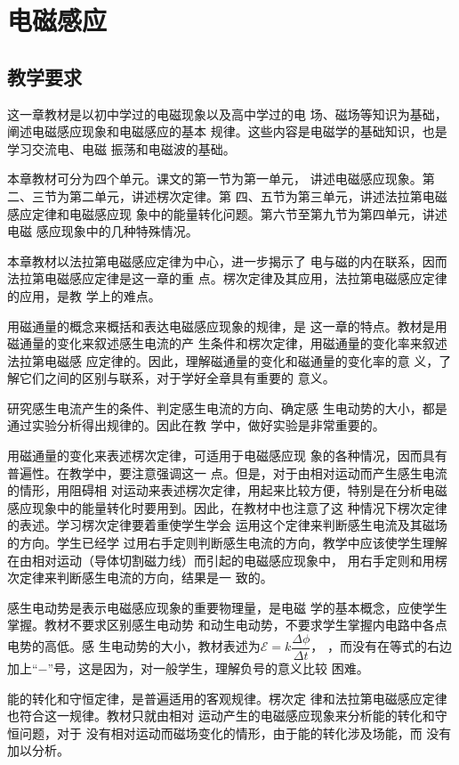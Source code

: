 \chapter{电磁感应}
\section{教学要求}
这一章教材是以初中学过的电磁现象以及高中学过的电
场、磁场等知识为基础，阐述电磁感应现象和电磁感应的基本
规律。这些内容是电磁学的基础知识，也是学习交流电、电磁
振荡和电磁波的基础。

本章教材可分为四个单元。课文的第一节为第一单元，
讲述电磁感应现象。第二、三节为第二单元，讲述楞次定律。第
四、五节为第三单元，讲述法拉第电磁感应定律和电磁感应现
象中的能量转化问题。第六节至第九节为第四单元，讲述电磁
感应现象中的几种特殊情况。

本章教材以法拉第电磁感应定律为中心，进一步揭示了
电与磁的内在联系，因而法拉第电磁感应定律是这一章的重
点。楞次定律及其应用，法拉第电磁感应定律的应用，是教
学上的难点。

用磁通量的概念来概括和表达电磁感应现象的规律，是
这一章的特点。教材是用磁通量的变化来叙述感生电流的产
生条件和楞次定律，用磁通量的变化率来叙述法拉第电磁感
应定律的。因此，理解磁通量的变化和磁通量的变化率的意
义，了解它们之间的区别与联系，对于学好全章具有重要的
意义。

研究感生电流产生的条件、判定感生电流的方向、确定感
生电动势的大小，都是通过实验分析得出规律的。因此在教
学中，做好实验是非常重要的。

用磁通量的变化来表述楞次定律，可适用于电磁感应现
象的各种情况，因而具有普遍性。在教学中，要注意强调这一
点。但是，对于由相对运动而产生感生电流的情形，用阻碍相
对运动来表述楞次定律，用起来比较方便，特别是在分析电磁
感应现象中的能量转化时要用到。因此，在教材中也注意了这
种情况下楞次定律的表述。学习楞次定律要着重使学生学会
运用这个定律来判断感生电流及其磁场的方向。学生已经学
过用右手定则判断感生电流的方向，教学中应该使学生理解
在由相对运动（导体切割磁力线）而引起的电磁感应现象中，
用右手定则和用楞次定律来判断感生电流的方向，结果是一
致的。

感生电动势是表示电磁感应现象的重要物理量，是电磁
学的基本概念，应使学生掌握。教材不要求区别感生电动势
和动生电动势，不要求学生掌握内电路中各点电势的高低。感
生电动势的大小，教材表述为$\mathcal{E}=k\dfrac{\Delta\phi}{\Delta t}$，
，而没有在等式的右边
加上“$-$”号，这是因为，对一般学生，理解负号的意义比较
困难。

能的转化和守恒定律，是普遍适用的客观规律。楞次定
律和法拉第电磁感应定律也符合这一规律。教材只就由相对
运动产生的电磁感应现象来分析能的转化和守恒问题，对于
没有相对运动而磁场变化的情形，由于能的转化涉及场能，而
没有加以分析。

